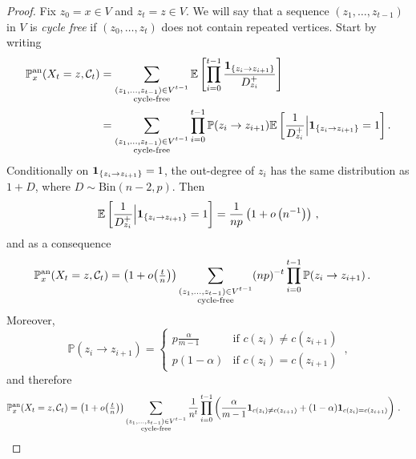 \documentclass[11pt,oneside]{amsart}
\numberwithin{equation}{section}  %
\theoremstyle{plain}
\newcommand{\E}{\mathbb{E}}
\newcommand{\p}{\mathbb{P}}
\newcommand{\PP}{\mathbb{P}}
\newcommand{\one}{\textup{\textbf{1}}}
\newcommand{\bin}{\text{Bin}}
\newcommand{\pan}{\p^{\textup{an}}}
\begin{document}
\begin{proof}
Fix $z_0=x\in V$ and $z_t=z\in V$. We will say that a sequence $(z_1,\dots,z_{t-1})$ in $V$ is \emph{cycle free} if $(z_0,\dots,z_{t})$ does not contain repeated vertices.
Start by writing
\begin{equation}
		\begin{split}
			\pan_x(X_t=z , \mathcal{C}_t)&=
			\sum_{\substack{(z_1, \dots, z_{t-1}) \in V^{t-1}\\\text{cycle-free} }} 
			\E\left[\prod_{i=0}^{t-1}\frac{\one_{\{z_i \to z_{i+1}\}}}{D^+_{z_i}}\right]
			\\&
			= 
			\sum_{\substack{(z_1, \dots, z_{t-1}) \in V^{t-1}\\\text{cycle-free} }} 
			\prod_{i=0}^{t-1} \PP(z_i\to z_{i+1})\E\left[\frac{1}{{D}^+_{z_i}}\Big| \one_{\{z_i\to z_{i+1}\}}=1\right].
		\end{split}
	\end{equation}
Conditionally on $\one_{\{z_i\to z_{i+1}\}}=1$, the out-degree of $z_i$ has the same distribution as $1+D$, where $D \sim \bin(n-2,p)$. Then
\begin{equation}
\E\left[\frac{1}{{D}^+_{z_i}}\Big| \one_{\{z_i\to z_{i+1}\}}=1\right]=\frac{1}{np}\left(1+o\left(n^{-1}\right)\right)\,,
\end{equation}
	and as a consequence
	\begin{equation}
		\begin{split}
			\pan_x(X_t=z , \mathcal{C}_t)&
			= 
			\left(1+o\big(\tfrac tn\big)\right)\sum_{\substack{(z_1, \dots, z_{t-1}) \in V^{t-1}\\\text{cycle-free} }} 
			(np)^{-t}\prod_{i=0}^{t-1} \PP(z_i\to z_{i+1})\,.
		\end{split}
	\end{equation}
Moreover, $$
	\PP(z_i\to z_{i+1})=\begin{cases}
		p\frac{\alpha}{m-1}&\text{if }c(z_i)\neq c(z_{i+1})\\
		p(1-\alpha)&\text{if }c(z_i)= c(z_{i+1})
	\end{cases}\,,
	$$ and therefore
		\begin{equation*}
		\begin{split}
			\pan_x(X_t=z , \mathcal{C}_t)&
			= 
			\left(1+o\big(\tfrac tn\big)\right)\sum_{\substack{(z_1, \dots, z_{t-1}) \in V^{t-1}\\\text{cycle-free} }} 
			\frac{1}{n^t}\prod_{i=0}^{t-1} \left(\frac{\alpha}{m-1}\one_{c(z_i)\neq c(z_{i+1})}+(1-\alpha)\one_{c(z_i)= c(z_{i+1})} \right)\,.
		\end{split}

\end{equation*}
\end{proof}
\end{document}
